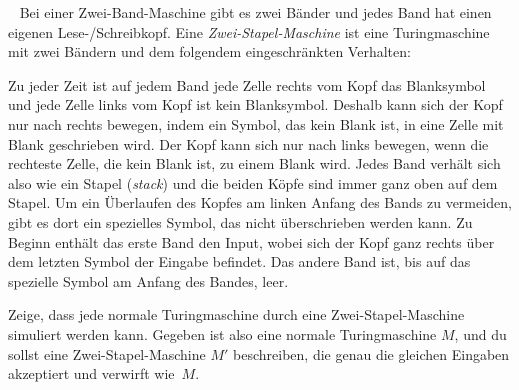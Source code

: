 \documentclass{uebung_cs}
\begin{document}
\begin{exercise}\
	Bei einer Zwei-Band-Maschine gibt es zwei Bänder und jedes Band hat einen eigenen Lese-/Schreibkopf.
	Eine \emph{Zwei-Stapel-Maschine} ist eine Turingmaschine mit zwei Bändern und dem folgendem eingeschränkten Verhalten:

	Zu jeder Zeit ist auf jedem Band jede Zelle rechts vom Kopf das Blanksymbol und jede Zelle links vom Kopf ist kein Blanksymbol. Deshalb kann sich der Kopf nur nach rechts bewegen, indem ein Symbol, das kein Blank ist, in eine Zelle mit Blank geschrieben wird. Der Kopf kann sich nur nach links bewegen, wenn die rechteste Zelle, die kein Blank ist, zu einem Blank wird. Jedes Band verhält sich also wie ein Stapel (\emph{stack}) und die beiden Köpfe sind immer ganz oben auf dem Stapel. Um ein Überlaufen des Kopfes am linken Anfang des Bands zu vermeiden, gibt es dort ein spezielles Symbol, das nicht überschrieben werden kann. Zu Beginn enthält das erste Band den Input, wobei sich der Kopf ganz rechts über dem letzten Symbol der Eingabe befindet. Das andere Band ist, bis auf das spezielle Symbol am Anfang des Bandes, leer.

	Zeige, dass jede normale Turingmaschine durch eine Zwei-Stapel-Maschine simuliert werden kann. Gegeben ist also eine normale Turingmaschine $M$, und du sollst eine Zwei-Stapel-Maschine $M'$ beschreiben, die genau die gleichen Eingaben akzeptiert und verwirft wie~$M$.
\end{exercise}
\end{document}
